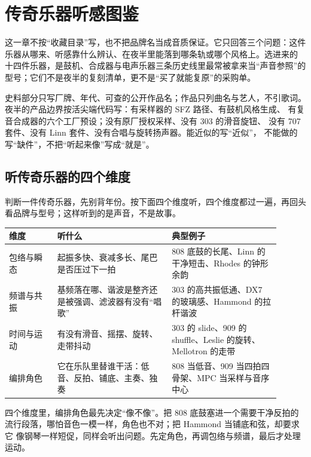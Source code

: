 \chapter{传奇乐器听感图鉴}
\label{chap:iconic-instruments}


这一章不按“收藏目录”写，也不把品牌名当成音质保证。它只回答三个问题：这件
乐器从哪来、听感靠什么辨认、在夜半里能落到哪条轨或哪个风格上。选进来的
十四件乐器，是鼓机、合成器与电声乐器三条历史线里最常被拿来当“声音参照”的
型号；它们不是夜半的复刻清单，更不是“买了就能复原”的采购单。

史料部分只写厂牌、年代、可查的公开作品名；作品只列曲名与艺人，不引歌词。
夜半的产品边界按活尖端代码写：有采样器的 SFZ 路径、有鼓机风格生成、
有复音合成器的六个工厂预设；没有原厂授权采样、没有 303 的滑音旋钮、
没有 707 套件、没有 Linn 套件、没有合唱与旋转扬声器。能近似的写“近似”，
不能做的写“缺件”，不把“听起来像”写成“就是”。

\section{听传奇乐器的四个维度}
\label{sec:iconic-listening}

判断一件传奇乐器，先别背年份。按下面四个维度听，四个维度都过一遍，再回头
看品牌与型号；这样听到的是声音，不是故事。

\begin{longtable}{p{0.16\linewidth}p{0.38\linewidth}p{0.36\linewidth}}
\hline
维度 & 听什么 & 典型例子 \\
\hline
\endhead
包络与瞬态 & 起振多快、衰减多长、尾巴是否压过下一拍 & 808 底鼓的长尾、Linn 的干净短击、Rhodes 的钟形余韵 \\
频谱与共振 & 基频落在哪、谐波是整齐还是被强调、滤波器有没有“唱歌” & 303 的高共振低通、DX7 的玻璃感、Hammond 的拉杆谐波 \\
时间与运动 & 有没有滑音、摇摆、旋转、走带抖动 & 303 的 slide、909 的 shuffle、Leslie 的旋转、Mellotron 的走带 \\
编排角色 & 它在乐队里替谁干活：低音、反拍、铺底、主奏、独奏 & 808 当低音、909 当四拍四骨架、MPC 当采样与音序中心 \\
\hline
\end{longtable}

四个维度里，编排角色最先决定“像不像”。把 808 底鼓塞进一个需要干净反拍的
流行段落，哪怕音色一模一样，角色也不对；把 Hammond 当铺底和弦，却要求它
像钢琴一样短促，同样会听出问题。先定角色，再调包络与频谱，最后才处理运动。

